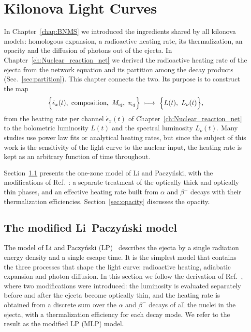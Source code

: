 \chapter{Kilonova Light Curves}\label{ch:rad_models}

In Chapter~\ref{chap:BNMS} we introduced the ingredients shared by all kilonova models: homologous expansion, a radioactive heating rate, its thermalization, an opacity and the diffusion of photons out of the ejecta.
In Chapter~\ref{ch:Nuclear_reaction_net} we derived the radioactive heating rate of the ejecta from the network equation and its partition among the decay products (Sec.~\ref{sec:partition}).
This chapter connects the two.
Its purpose is to construct the map
\begin{equation}\label{eq:kn_map}
  \Big\{\dot\epsilon_x(t),\ \text{composition},\ M_{\rm ej},\ v_{\rm ej}\Big\}\ \longmapsto\ \Big\{L(t),\ L_\nu(t)\Big\},
\end{equation}
from the heating rate per channel $\dot\epsilon_x(t)$ of Chapter~\ref{ch:Nuclear_reaction_net} to the bolometric luminosity $L(t)$ and the spectral luminosity $L_\nu(t)$.
Many studies use power law fits or analytical heating rates, but since the subject of this work is the sensitivity of the light curve to the nuclear input, the heating rate is kept as an arbitrary function of time throughout.

Section~\ref{sec:onezone} presents the one-zone model of Li and Paczy\'nski, with the modifications of Ref.~\cite{hernandez_porras_features_2027}: a separate treatment of the optically thick and optically thin phases, and an effective heating rate built from $\alpha$ and $\beta^-$ decays with their thermalization efficiencies.
Section~\ref{sec:opacity} discusses the opacity.

\section{The modified Li--Paczy\'nski model}\label{sec:onezone}

The model of Li and Paczy\'nski (LP)~\cite{li_transient_1998} describes the ejecta by a single radiation energy density and a single escape time.
It is the simplest model that contains the three processes that shape the light curve: radioactive heating, adiabatic expansion and photon diffusion.
In this section we follow the derivation of Ref.~\cite{hernandez_porras_features_2027}, where two modifications were introduced: the luminosity is evaluated separately before and after the ejecta become optically thin, and the heating rate is obtained from a discrete sum over the $\alpha$ and $\beta^-$ decays of all the nuclei in the ejecta, with a thermalization efficiency for each decay mode.
We refer to the result as the modified LP (MLP) model.

